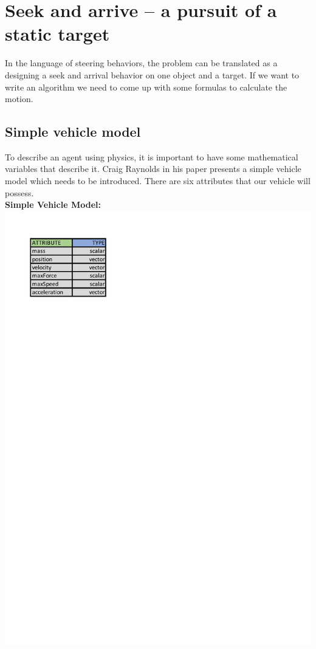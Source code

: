 \documentclass[10pt,twoside,english,a4paper]{article}
\begin{document}
\section{Seek and arrive – a pursuit of a static target} \label{seek and arrive}

In the language of steering behaviors, the problem can be translated as 
a designing a seek and arrival behavior on one object and a target. 
If we want to write an algorithm we need to come up with some 
formulas to calculate the motion.

\subsection{Simple vehicle model} \label{model}
To describe an agent using physics, it is important to have some
mathematical variables that describe it. Craig Raynolds in his 
paper \cite{Raynolds} presents a simple 
vehicle model which needs to be introduced. There are six 
attributes that our vehicle will possess. \\
\textbf{Simple Vehicle Model:} \\
\includegraphics[scale=0.6]{attributes.pdf}
\end{document}
